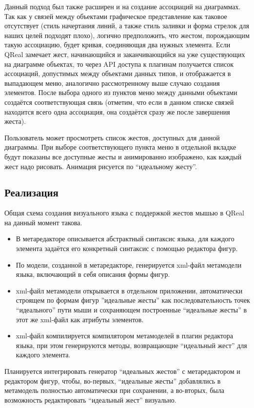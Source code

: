 \documentclass[a5paper]{article}
\begin{document}
Данный подход был также расширен и на создание ассоциаций на диаграммах. Так как у связей между объектами графическое представление как таковое отсутствует (стиль начертания линий, а также стиль заливки и форма стрелок для наших целей подходят плохо), логично предположить, что жестом, порождающим такую ассоциацию, будет кривая, соединяющая два нужных элемента. Если QReal замечает жест, начинающийся и заканчивающийся на уже существующих на диаграмме объектах, то через API доступа к плагинам получается список ассоциаций, допустимых между объектами данных типов, и отображается в выпадающем меню, аналогично рассмотренному выше случаю создания элементов. После выбора одного из пунктов меню между данными объектами создаётся соответствующая связь (отметим, что если в данном списке связей находится всего одна ассоциация, она создаётся сразу же после завершения жеста).

Пользователь может просмотреть список жестов, доступных для данной диаграммы. При выборе соответствующего пункта меню в отдельной вкладке будут показаны все доступные жесты и анимированно изображено, как каждый жест надо рисовать. Анимация рисуется по ``идеальному жесту''.

\subsection{Реализация}

Общая схема создания визуального языка с поддержкой жестов мышью в QReal на данный момент такова.
\begin{itemize}
  \item В метаредакторе описывается абстрактный синтаксис языка, для каждого элемента задаётся его конкретный синтаксис с помощью редактора фигур.
  \item По модели, созданной в метаредакторе, генерируется xml-файл метамодели языка, включающий в себя описания формы фигур.
  \item xml-файл метамодели открывается в отдельном приложении, автоматически строящем по формам фигур ''идеальные жесты'' как последовательность точек ``идеального'' пути мыши и сохраняющем построенные ``идеальные жесты'' в этот же xml-файл как атрибуты элементов.
  \item xml-файл компилируется компилятором метамоделей в плагин редактора языка, при этом генерируются методы, возвращающие ``идеальный жест'' для каждого элемента.
\end{itemize}
Планируется интегрировать генератор ``идеальных жестов'' с метаредактором и редактором фигур, чтобы, во-первых, ``идеальные жесты'' добавлялись в метамодель полностью автоматически при сохранении, а во-вторых, была возможность редактировать ``идеальный жест'' визуально.
\end{document}

